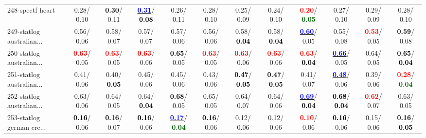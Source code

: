 \begin{table}[h]
\begin{center}
{\begin{tabular}{lc|c|c|c|c|c|c|c|c|c|c}
248-spectf heart &   0.28/  0.10 & \textcolor{black}{\textbf{  0.30}}/  0.11 & \underline{\textcolor{blue}{\textbf{  0.31}}}/\textcolor{black}{\textbf{  0.08}} &   0.26/  0.11 &   0.28/  0.10 &   0.25/  0.09 &   0.24/  0.10 & \textcolor{red}{\textbf{  0.20}}/\textcolor{darkgreen}{\textbf{  0.05}} &   0.27/  0.10 &   0.29/  0.09 &   0.28/  0.10 \\
249-statlog australian... &   0.56/  0.06 &   0.58/  0.07 &   0.57/  0.07 &   0.57/  0.06 &   0.56/  0.06 &   0.58/\textcolor{black}{\textbf{  0.04}} &   0.58/\textcolor{black}{\textbf{  0.04}} & \underline{\textcolor{blue}{\textbf{  0.60}}}/  0.05 &   0.55/  0.08 & \textcolor{red}{\textbf{  0.53}}/  0.05 & \textcolor{black}{\textbf{  0.59}}/  0.08 \\
250-statlog australian... & \textcolor{red}{\textbf{  0.63}}/  0.05 & \textcolor{red}{\textbf{  0.63}}/  0.05 & \textcolor{red}{\textbf{  0.63}}/  0.06 & \textcolor{black}{\textbf{  0.65}}/  0.05 & \textcolor{red}{\textbf{  0.63}}/  0.05 & \textcolor{red}{\textbf{  0.63}}/  0.06 & \textcolor{red}{\textbf{  0.63}}/  0.06 & \textcolor{red}{\textbf{  0.63}}/\textcolor{black}{\textbf{  0.04}} & \underline{\textcolor{blue}{\textbf{  0.66}}}/  0.05 &   0.64/  0.05 & \textcolor{black}{\textbf{  0.65}}/\textcolor{black}{\textbf{  0.04}} \\
251-statlog australian... &   0.41/  0.06 &   0.40/\textcolor{black}{\textbf{  0.05}} &   0.45/  0.06 &   0.45/  0.06 &   0.43/  0.06 & \textcolor{black}{\textbf{  0.47}}/\textcolor{black}{\textbf{  0.05}} & \textcolor{black}{\textbf{  0.47}}/\textcolor{black}{\textbf{  0.05}} &   0.41/  0.07 & \underline{\textcolor{blue}{\textbf{  0.48}}}/  0.06 &   0.39/  0.06 & \textcolor{red}{\textbf{  0.28}}/\textcolor{darkgreen}{\textbf{  0.04}} \\
252-statlog australian... &   0.63/  0.06 &   0.64/  0.05 &   0.64/\textcolor{black}{\textbf{  0.04}} & \textcolor{black}{\textbf{  0.68}}/  0.05 &   0.65/  0.05 &   0.64/  0.07 &   0.64/  0.06 & \underline{\textcolor{blue}{\textbf{  0.69}}}/\textcolor{black}{\textbf{  0.04}} & \textcolor{black}{\textbf{  0.68}}/\textcolor{black}{\textbf{  0.04}} & \textcolor{red}{\textbf{  0.62}}/  0.07 &   0.63/  0.05 \\ \hline
253-statlog german cre... & \textcolor{black}{\textbf{  0.16}}/  0.06 & \textcolor{black}{\textbf{  0.16}}/  0.07 & \textcolor{black}{\textbf{  0.16}}/  0.06 & \underline{\textcolor{blue}{\textbf{  0.17}}}/\textcolor{darkgreen}{\textbf{  0.04}} & \textcolor{black}{\textbf{  0.16}}/  0.06 &   0.12/  0.06 &   0.12/  0.06 & \textcolor{red}{\textbf{  0.10}}/  0.06 & \textcolor{black}{\textbf{  0.16}}/  0.06 &   0.15/  0.06 & \textcolor{black}{\textbf{  0.16}}/\textcolor{black}{\textbf{  0.05}} \\

\end{tabular}}
\end{center}
\end{table}
